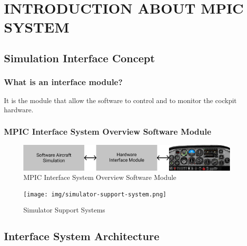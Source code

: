 \chapter{INTRODUCTION ABOUT MPIC SYSTEM}

\renewcommand{\headrulewidth}{0.5pt}
\renewcommand{\footrulewidth}{0.5pt}
\thispagestyle{plain}
\pagestyle{fancy}
\fancyhf{}
\raggedright
{}

\section{Simulation Interface Concept}
    \subsection{What is an interface module?}
        It is the module that allow the software to control and to monitor the cockpit hardware.
    \subsection{MPIC Interface System Overview Software Module}
        \begin{figure}[H]
            \centering
            \includegraphics[width=0.6\linewidth]{img/MPIC.png}
            \caption{MPIC Interface System Overview Software Module}
        \end{figure}
        \begin{figure}[H]
            \centering
            \texttt{[image: img/simulator-support-system.png]}
            \caption{Simulator Support Systems}
        \end{figure}

\section{Interface System Architecture}
